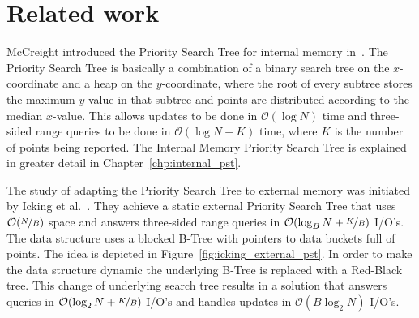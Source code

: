 \documentclass[twoside,11pt,openright]{report}
\begin{document}
\chapter{Related work}
\label{chp:related_work}
McCreight introduced the Priority Search Tree for internal memory in~\cite{DBLP:journals/siamcomp/McCreight85}. The Priority Search Tree is basically a combination of a binary search tree on the $x$-coordinate and a heap on the $y$-coordinate, where the root of every subtree stores the maximum $y$-value in that subtree and points are distributed according to the median $x$-value. This allows updates to be done in $\mathcal{O}(\log N)$ time and three-sided range queries to be done in $\mathcal{O}(\log N + K)$ time, where $K$ is the number of points being reported. The Internal Memory Priority Search Tree is explained in greater detail in Chapter~\ref{chp:internal_pst}.

The study of adapting the Priority Search Tree to external memory was initiated by Icking et al.~\cite{Icking1988}. They achieve a static external Priority Search Tree that uses $\mathcal{O}(\nicefrac{N}{B})$ space and answers three-sided range queries in $\mathcal{O}(\log_B N + \nicefrac{K}{B})$ I/O's. The data structure uses a blocked B-Tree with pointers to data buckets full of points. The idea is depicted in Figure~\ref{fig:icking_external_pst}. In order to make the data structure dynamic the underlying B-Tree is replaced with a Red-Black tree. This change of underlying search tree results in a solution that answers queries in $\mathcal{O}(\log_2 N + \nicefrac{K}{B})$ I/O's and handles updates in $\mathcal{O}(B \log_2 N)$ I/O's.
\end{document}
